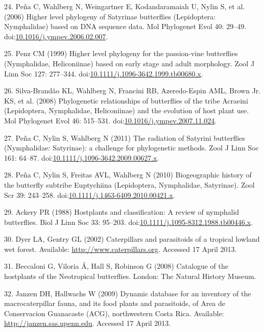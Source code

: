 \documentclass[10pt]{article}
\begin{document}
24. Peña C, Wahlberg N, Weingartner E, Kodandaramaiah U, Nylin S, et al.
(2006) Higher level phylogeny of Satyrinae butterflies (Lepidoptera:
Nymphalidae) based on DNA sequence data. Mol Phylogenet Evol 40: 29--49.
doi:\href{http://dx.doi.org/10.1016/j.ympev.2006.02.007}{10.1016/j.ympev.2006.02.007}.

25. Penz CM (1999) Higher level phylogeny for the passion-vine
butterflies (Nymphalidae, Heliconiinae) based on early stage and adult
morphology. Zool J Linn Soc 127: 277--344.
doi:\href{http://dx.doi.org/10.1111/j.1096-3642.1999.tb00680.x}{10.1111/j.1096-3642.1999.tb00680.x}.

26. Silva-Brandão KL, Wahlberg N, Francini RB, Azeredo-Espin AML, Brown
Jr. KS, et al. (2008) Phylogenetic relationships of butterflies of the
tribe Acraeini (Lepidoptera, Nymphalidae, Heliconiinae) and the
evolution of host plant use. Mol Phylogenet Evol 46: 515--531.
doi:\href{http://dx.doi.org/10.1016/j.ympev.2007.11.024}{10.1016/j.ympev.2007.11.024}.

27. Peña C, Nylin S, Wahlberg N (2011) The radiation of Satyrini
butterflies (Nymphalidae: Satyrinae): a challenge for phylogenetic
methods. Zool J Linn Soc 161: 64--87.
doi:\href{http://dx.doi.org/10.1111/j.1096-3642.2009.00627.x}{10.1111/j.1096-3642.2009.00627.x}.

28. Peña C, Nylin S, Freitas AVL, Wahlberg N (2010) Biogeographic
history of the butterfly subtribe Euptychiina (Lepidoptera, Nymphalidae,
Satyrinae). Zool Scr 39: 243--258.
doi:\href{http://dx.doi.org/10.1111/j.1463-6409.2010.00421.x}{10.1111/j.1463-6409.2010.00421.x}.

29. Ackery PR (1988) Hostplants and classification: A review of
nymphalid butterflies. Biol J Linn Soc 33: 95--203.
doi:\href{http://dx.doi.org/10.1111/j.1095-8312.1988.tb00446.x}{10.1111/j.1095-8312.1988.tb00446.x}.

30. Dyer LA, Gentry GL (2002) Caterpillars and parasitoids of a tropical
lowland wet forest. Available: \url{http://www.caterpillars.org}.
Accessed 17 April 2013.

31. Beccaloni G, Viloria Á, Hall S, Robinson G (2008) Catalogue of the
hostplants of the Neotropical butterflies. London: The Natural History
Museum.

32. Janzen DH, Hallwachs W (2009) Dynamic database for an inventory of
the macrocaterpillar fauna, and its food plants and parasitoids, of Area
de Conservacion Guanacaste (ACG), northwestern Costa Rica. Available:
\url{http://janzen.sas.upenn.edu}. Accessed 17 April 2013.
\end{document}
